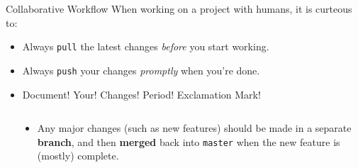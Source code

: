 \documentclass[11pt]{beamer}
\begin{document}
\begin{frame}{Collaborative Workflow}
When working on a project with humans, it is curteous to:
\begin{itemize}
\item Always \texttt{pull} the latest changes \emph{before} you start working.
\item Always \texttt{push} your changes \emph{promptly} when you're done.
\item Document! Your! Changes! Period! Exclamation Mark!
\end{itemize} 
\begin{columns}
\begin{column}{0.48\textwidth}
\end{column}
\begin{column}{0.48\textwidth}
\begin{itemize}
\item Any major changes (such as new features) should be made in a separate \textbf{branch}, and then \textbf{merged} back into \texttt{master} when the new feature is (mostly) complete.  
\end{itemize}

\end{column}
\end{columns}
\end{frame}
\end{document}
